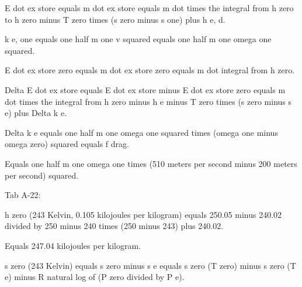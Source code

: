 E dot ex store equals m dot ex store equals m dot times the integral from h zero to h zero minus T zero times (s zero minus s one) plus h e, d.

k e, one equals one half m one v squared equals one half m one omega one squared.

E dot ex store zero equals m dot ex store zero equals m dot integral from h zero.

Delta E dot ex store equals E dot ex store minus E dot ex store zero equals m dot times the integral from h zero minus h e minus T zero times (s zero minus s e) plus Delta k e.

Delta k e equals one half m one omega one squared times (omega one minus omega zero) squared equals f drag.

Equals one half m one omega one times (510 meters per second minus 200 meters per second) squared.

Tab A-22:

h zero (243 Kelvin, 0.105 kilojoules per kilogram) equals 250.05 minus 240.02 divided by 250 minus 240 times (250 minus 243) plus 240.02.

Equals 247.04 kilojoules per kilogram.

s zero (243 Kelvin) equals s zero minus s e equals s zero (T zero) minus s zero (T e) minus R natural log of (P zero divided by P e).